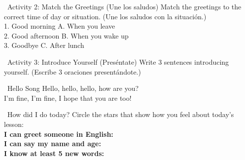 \begin{activity}{ \ Activity 2: Match the Greetings (Une los saludos)}
  Match the greetings to the correct time of day or situation. (Une los saludos con la situación.)\\
  1. Good morning \qquad A. When you leave\\
  2. Good afternoon \qquad B. When you wake up\\
  3. Goodbye \qquad C. After lunch
  \writinglines[3]
\end{activity}

\begin{activity}{ \ Activity 3: Introduce Yourself (Preséntate)}
  Write 3 sentences introducing yourself. (Escribe 3 oraciones presentándote.)
  \writinglines[3]
\end{activity}

\begin{songbox}{ \ Hello Song}
  Hello, hello, hello, how are you?\\
  I'm fine, I'm fine, I hope that you are too!
\end{songbox}

\vspace{1em}
\begin{grammartip}{ \ How did I do today?}
  Circle the stars that show how you feel about today's lesson:\\[6pt]
  \textbf{I can greet someone in English:} \selfcheck[0] \\[4pt]
  \textbf{I can say my name and age:} \selfcheck[0] \\[4pt]
  \textbf{I know at least 5 new words:} \selfcheck[0]
\end{grammartip}
